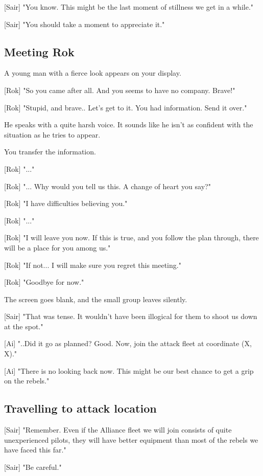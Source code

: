 \documentclass[a4paper,12pt]{article}
\begin{document}
[Sair] "You know. This might be the last moment of stillness we get in a while."

[Sair] "You should take a moment to appreciate it."

\subsection{Meeting Rok}

A young man with a fierce look appears on your display.

[Rok] "So you came after all. And you seems to have no company. Brave!"

[Rok] "Stupid, and brave.. Let's get to it. You had information. Send it over."

He speaks with a quite harsh voice. It sounds like he isn't as confident with
the situation as he tries to appear. 

You transfer the information.

[Rok] "..."

[Rok] "... Why would you tell us this. A change of heart you say?" 

[Rok] "I have difficulties believing you."

[Rok] "..."

[Rok] "I will leave you now. If this is true, and you follow the plan through,
there will be a place for you among us." 

[Rok] "If not... I will make sure you regret this meeting."

[Rok] "Goodbye for now."

The screen goes blank, and the small group leaves silently.

[Sair] "That was tense. It wouldn't have been illogical for them to shoot us down at the spot."

[Ai] "..Did it go as planned? Good. Now, join the attack fleet at coordinate (X, X)." 

[Ai] "There is no looking back now. This might be our best chance to get a grip on the rebels."

\subsection{Travelling to attack location}

[Sair] "Remember. Even if the Alliance fleet we will join consists of quite
unexperienced pilots, they will have better equipment than most of the rebels we have faced this far."

[Sair] "Be careful."
\end{document}
